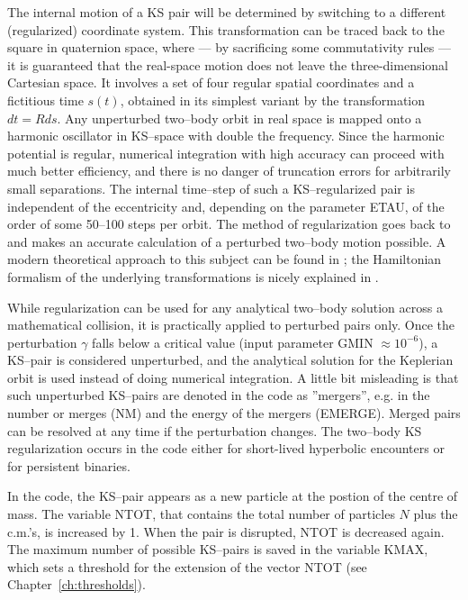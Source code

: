 The internal motion of a KS pair will be determined by switching
to a different (regularized) coordinate system. %
This transformation can be traced back to the square in quaternion
space, where --- by sacrificing some commutativity rules --- it is
guaranteed that the real-space motion does not leave the
three-dimensional Cartesian space.
It involves a set of four regular spatial coordinates and a
fictitious time $s(t)$, obtained in its simplest variant by the
transformation $dt = R ds$. %
Any unperturbed two--body orbit in real space is mapped onto
a harmonic oscillator in KS--space with double the frequency.
Since the harmonic potential is regular, numerical integration with
high accuracy can proceed with much better efficiency, and there
is no danger of truncation errors for arbitrarily small separations.
The internal time--step of such a KS--regularized pair is independent
of the eccentricity and, depending on the parameter ETAU, of the
order of some 50--100 steps per orbit. 
%
The method of regularization goes back to \cite{ks_65} and makes an
accurate calculation of a perturbed two--body motion possible.
A modern theoretical approach to this subject can be found in
\cite{ns_92};
the Hamiltonian formalism of the underlying transformations is
nicely explained in \cite{m_97}.

While regularization can be used for any analytical two--body
solution across a mathematical collision, it is practically applied
to perturbed pairs only.
Once the perturbation $\gamma$ falls below a critical value
(input parameter GMIN $\approx 10^{-6}$),
a KS--pair is considered unperturbed, and the analytical solution for
the Keplerian orbit is used instead of doing numerical integration.
A little bit misleading is that such unperturbed KS--pairs are
denoted in the code as ''mergers'', e.g. in the number or merges (NM)
and the energy of the mergers (EMERGE).
Merged pairs can be resolved at any time if the perturbation changes.
The two--body KS regularization occurs in the code either for
short-lived hyperbolic encounters or for persistent binaries. 

In the code, the KS--pair appears as a new particle at the postion
of the centre of mass.
The variable NTOT, that contains the total number of particles $N$
plus the c.m.'s, is increased by 1.
When the pair is disrupted, NTOT is decreased again.
The maximum number of possible KS--pairs is saved in the variable
KMAX, which sets a threshold for the extension of the vector NTOT
(see Chapter~\ref{ch:thresholds}).\\

